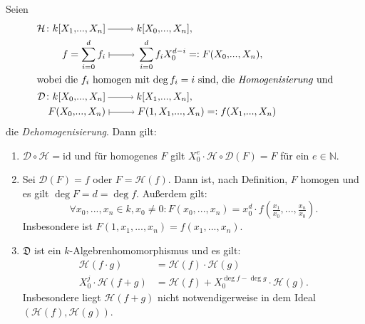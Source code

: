 \documentclass[a4paper,12pt,index=toc]{scrbook}
\theoremstyle{keinenummern} %
\newcommand{\D}{\mathfrak{D}}
\newcommand{\DD}{\mathcal{D}} %
\renewcommand{\H}{\mathcal{H}} %
\newcommand{\id}{\mathrm{id}}
\renewcommand{\dotsc}{\ensuremath{\!...}}
\newcommand{\set}[1]{\ensuremath{\mathbb{#1}}}
\newcommand{\N}{\set{N}}
\newcommand{\polyx}[1][n]{\ensuremath%
  [X_{1},\dotsc,X_{#1}]}
\newcommand{\ppolyx}[1][n]{\ensuremath%
  [X_{0},\dotsc,X_{#1}]}
\begin{document}
\begin{dl}\label{2.3.9} Seien
\begin{align*}\H\colon k\polyx&\ra k\ppolyx,\\
 f=\sum_{i=0}^{d}f_{i}&\mapsto\sum_{i=0}^{d}f_{i}X_{0}^{d-i}=:F(X_{0},\dotsc,X_{n}),\\
\intertext{wobei die $f_{i}$ homogen mit $\deg f_{i}=i$ sind, die \emph{Homogenisierung\index{Homogenisierung}} und}
\DD\colon k\ppolyx&\ra k\polyx,\\
F(X_{0},\dotsc,X_{n})&\mapsto F(1,X_{1},\dotsc,X_{n})=:f(X_{1},\dotsc,X_{n})\end{align*}
die \emph{Dehomogenisierung}. Dann gilt:
\begin{enumerate}
\item{} $\DD\circ \H=\id$ und für homogenes $F$ gilt $X_{0}^{e}\cdot \H\circ \DD(F)=F$ für ein $e\in\N$.
\item{} Sei $\DD(F)=f$ oder $F=\H(f)$. Dann ist, nach Definition, $F$ homogen und es gilt $\deg F=d=\deg f$. Außerdem gilt:\vspace*{-6pt}
\[\forall x_{0},\dotsc,x_{n}\in k, x_{0}\neq 0\colon  F(x_{0},\dotsc,x_{n})=x_{0}^{d}\cdot f(\tfrac{x_{1}}{x_{0}},\dotsc,\tfrac{x_{n}}{x_{0}}).\]
Insbesondere ist $F(1,x_{1},\dotsc,x_{n}) = f(x_{1},\dotsc,x_{n})$.
\item{} $\D$ ist ein $k$-Algebrenhomomorphismus und es gilt:
\begin{align*}
\H(f\cdot g)&=\H(f)\cdot \H(g)\\
X_{0}^{j}\cdot\H(f+g)&=\H(f)+X_{0}^{\deg f-\deg g}\cdot \H(g).\end{align*}
Insbesondere liegt $\H(f+g)$ nicht notwendigerweise in dem Ideal $(\H(f),\H(g))$.
\end{enumerate}\end{dl}
%
\end{document}
